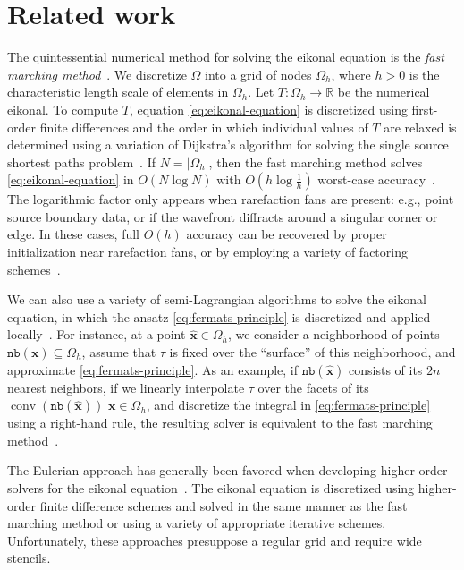 \documentclass{siamart190516}
\newcommand{\m}[1]{\boldsymbol{#1}}
\newcommand{\nb}{\texttt{nb}}
\newcommand{\xhat}{\hat{\m{x}}}
\DeclareMathOperator{\conv}{conv}
\begin{document}
\section{Related work}

The quintessential numerical method for solving the eikonal equation
is the \emph{fast marching method}~\cite{Sethian:1996aa}. We
discretize $\Omega$ into a grid of nodes $\Omega_h$, where $h > 0$ is
the characteristic length scale of elements in $\Omega_h$. Let
$T : \Omega_h \to \mathbb{R}$ be the numerical eikonal. To compute
$T$, equation \eqref{eq:eikonal-equation} is discretized using
first-order finite differences and the order in which individual
values of $T$ are relaxed is determined using a variation of
Dijkstra's algorithm for solving the single source shortest paths
problem~\cite{Sethian:1999ac,Sethian:1999ab}. If $N = |\Omega_h|$,
then the fast marching method solves \eqref{eq:eikonal-equation} in
$O(N \log N)$ with $O(h \log \tfrac{1}{h})$ worst-case
accuracy~\cite{Zhao:2005aa}. The logarithmic factor only appears when
rarefaction fans are present: e.g., point source boundary data, or if
the wavefront diffracts around a singular corner or edge. In these
cases, full $O(h)$ accuracy can be recovered by proper initialization
near rarefaction fans, or by employing a variety of factoring
schemes~\cite{Qi:2019aa}.

We can also use a variety of semi-Lagrangian algorithms to solve the
eikonal equation, in which the ansatz \eqref{eq:fermats-principle} is
discretized and applied locally~\cite{Tsitsiklis:1995aa}. For
instance, at a point $\hat{\m{x}} \in \Omega_h$, we consider a
neighborhood of points $\nb(\m{x}) \subseteq \Omega_h$, assume that
$\tau$ is fixed over the ``surface'' of this neighborhood, and
approximate \eqref{eq:fermats-principle}. As an example, if
$\nb(\hat{\m{x}})$ consists of its $2n$ nearest neighbors, if we
linearly interpolate $\tau$ over the facets of its $\conv(\nb(\xhat))$
$\m{x} \in \Omega_h$, and discretize the integral in
\eqref{eq:fermats-principle} using a right-hand rule, the resulting
solver is equivalent to the fast marching
method~\cite{Sethian:2003aa}.

The Eulerian approach has generally been favored when developing
higher-order solvers for the eikonal equation~\cite{Zhang:2006aa}. The
eikonal equation is discretized using higher-order finite difference
schemes and solved in the same manner as the fast marching method or
using a variety of appropriate iterative schemes. Unfortunately, these
approaches presuppose a regular grid and require wide stencils.
\end{document}
